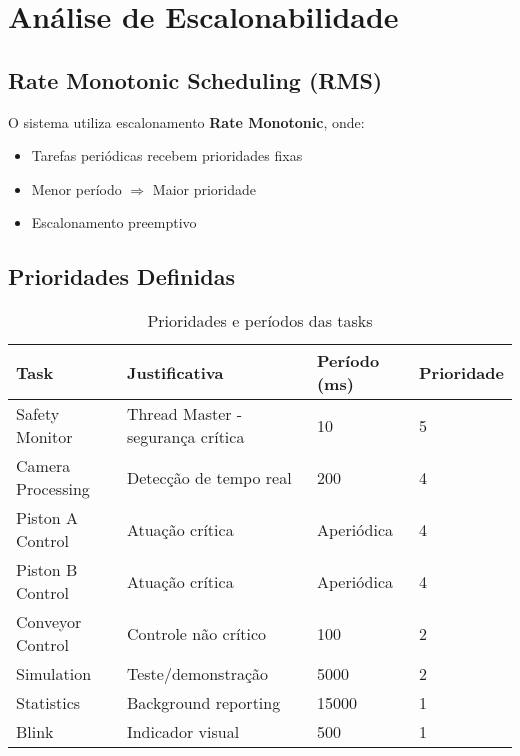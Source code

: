 \documentclass[12pt,a4paper]{article}
\begin{document}
\section{Análise de Escalonabilidade}

\subsection{Rate Monotonic Scheduling (RMS)}

O sistema utiliza escalonamento \textbf{Rate Monotonic}, onde:
\begin{itemize}
    \item Tarefas periódicas recebem prioridades fixas
    \item Menor período $\Rightarrow$ Maior prioridade
    \item Escalonamento preemptivo
\end{itemize}

\subsection{Prioridades Definidas}

\begin{table}[H]
\centering
\begin{tabularx}{\textwidth}{lXll}
\toprule
\textbf{Task} & \textbf{Justificativa} & \textbf{Período (ms)} & \textbf{Prioridade} \\
\midrule
Safety Monitor & Thread Master - segurança crítica & 10 & 5 \\
Camera Processing & Detecção de tempo real & 200 & 4 \\
Piston A Control & Atuação crítica & Aperiódica & 4 \\
Piston B Control & Atuação crítica & Aperiódica & 4 \\
Conveyor Control & Controle não crítico & 100 & 2 \\
Simulation & Teste/demonstração & 5000 & 2 \\
Statistics & Background reporting & 15000 & 1 \\
Blink & Indicador visual & 500 & 1 \\
\bottomrule
\end{tabularx}
\caption{Prioridades e períodos das tasks}
\end{table}
\end{document}
